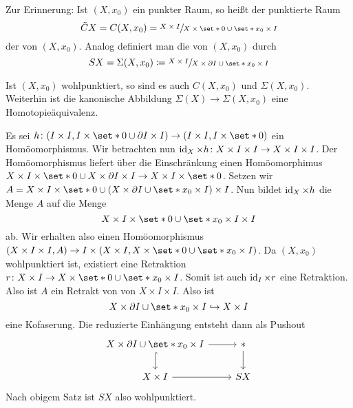 Zur Erinnerung: Ist $(X,x_0)$ ein punkter Raum, so heißt der punktierte Raum 
\[
	\tilde{C}X = C(X,x_0) = \sfrac{X \times I}{X \times \set*{0} \cup \set*{x_0} \times I}
\]
der  von $(X,x_0)$.
Analog definiert man die  von $(X,x_0)$ durch
\[
	S X =\Sigma(X,x_0) \coloneqq \sfrac{X \times I}{X \times \partial I \cup \set*{x_0} \times I}
\]

\begin{satz}
	Ist $(X,x_0)$ wohlpunktiert, so sind es auch $C(X,x_0)$ und $\Sigma(X,x_0)$.
	Weiterhin ist die kanonische Abbildung $\Sigma(X) \to \Sigma(X,x_0)$ eine Homotopieäquivalenz.
\end{satz}
\begin{beweis}
	Es sei $h \colon (I \times I,I \times \set*{0} \cup \partial I \times I) \to (I \times I, I \times \set*{0})$ ein Homöomorphismus.
	Wir betrachten nun $\operatorname{id}_X \times h \colon X \times I \times I \to X \times I \times I$.
	Der Homöomorphismus liefert über die Einschränkung einen Homöomorphimus $X \times I \times \set*{0} \cup X \times \partial I \times I \to X \times I \times \set*{0}$.
	Setzen wir $A=X \times I \times \set*{0} \cup \enbrace*{X \times \partial I\cup \set*{x_0} \times I} \times I$.
	Nun bildet $\operatorname{id}_X \times h$ die Menge $A$ auf die Menge
	\[
		X \times I \times \set*{0} \cup \set*{x_0} \times I \times I
	\]
	ab.
	Wir erhalten also einen Homöomorphismus $(X \times I \times I,A) \to I \times \enbrace*{X \times I,X \times \set*{0} \cup \set*{x_0} \times I}$.
	Da $(X,x_0)$ wohlpunktiert ist, existiert eine Retraktion $r \colon X \times I \to X \times \set*{0} \cup \set*{x_0} \times I$.
	Somit ist auch $\operatorname{id}_I \times r$ eine Retraktion.
	Also ist $A$ ein Retrakt von von $X \times I \times I$.
	Also ist 
	\[
		X \times \partial I \cup \set*{x_0} \times I \hookrightarrow X \times I
	\]
	eine Kofaserung.
	Die reduzierte Einhängung entsteht dann als Pushout
	\[
		\begin{tikzcd}
			X \times \partial I \cup \set*{x_0} \times I \rar \dar[hook] & * \dar\\
			X \times I \rar & SX
		\end{tikzcd}
	\]
	Nach obigem Satz ist $SX$ also wohlpunktiert.
	

\end{beweis}
